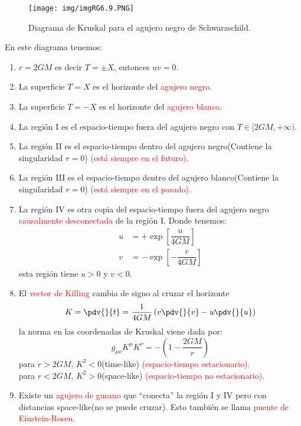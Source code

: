 \documentclass[../main]{subfiles}
\begin{document}
\begin{adjustwidth}{0pt}{-100pt}
\begin{figure}[H]
    \begin{adjustwidth}{0pt}{-100pt}
    \centering
    \texttt{[image: img/imgRG6.9.PNG]}
    \caption{Diagrama de Kruskal para el agujero negro de Schwarzschild.}
    \end{adjustwidth}
\end{figure}

En este diagrama tenemos:
\begin{enumerate}
    \item $r=2GM$ es decir $T=\pm X$, entonces $uv=0$.
    \item La superficie $T=X$ es el horizonte del \textcolor{red}{agujero negro}.
    \item La superficie $T=-X$ es el horizonte del \textcolor{red}{agujero blanco}.
    \item La región I es el espacio-tiempo fuera del agujero negro con $T \in [2GM, +\infty)$.
    \item La región II es el espacio-tiempo dentro del agujero negro(Contiene la singularidad $r=0$) \textcolor{red}{(está siempre en el futuro).}
    \item La región III es el espacio-tiempo dentro del agujero blanco(Contiene la singularidad $r=0$) \textcolor{red}{(está siempre en el pasado).}
    \item La región IV es otra copia del espacio-tiempo fuera del agujero negro \textcolor{red}{causalmente desconectada} de la región I. Donde tenemos:
    \begin{align}
        u&=+\exp\left[\dfrac{u}{4GM}\right]\\
        v&=-\exp\left[-\dfrac{v}{4GM}\right]
    \end{align}
    esta región tiene $u>0$ y $v<0$.
    \item El \textcolor{red}{vector de Killing} cambia de signo al cruzar el horizonte 
    \begin{equation}
        K=\pdv{}{t}=\dfrac{1}{4GM}\left(v\pdv{}{v}-u\pdv{}{u}\right)
    \end{equation}
    la norma en las coordenadas de Kruskal viene dada por:
    \begin{equation}
        g_{\mu\nu}K^{\mu}K^{\nu}=-\left(1-\dfrac{2GM}{r}\right)
    \end{equation}
    para $r>2GM$, $K^2<0$(time-like) \textcolor{red}{(espacio-tiempo estacionario).}\\
    para $r<2GM$, $K^2>0$(space-like) \textcolor{red}{(espacio-tiempo no estacionario).}
    \item Existe un \textcolor{red}{agujero de gusano} que ``conecta'' la región I y IV pero con distancias space-like(no se puede cruzar). Esto también se llama \textcolor{red}{puente de Einstein-Rosen.}
\end{enumerate}


\end{adjustwidth}
\end{document}
